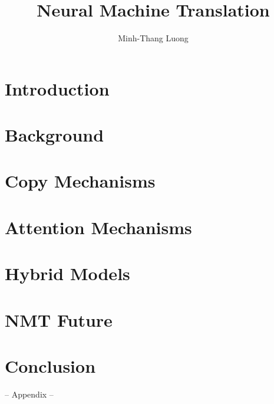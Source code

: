 \documentclass[12pt]{report}
\begin{document}
\title{Neural Machine Translation}
\author{Minh-Thang Luong}

\beforepreface
%
%
\afterpreface


\chapter{Introduction}
\label{c:intro}


\chapter{Background}
\label{c:background}


\chapter{Copy Mechanisms}
\label{c:copy}


\chapter{Attention Mechanisms}
\label{c:attention}


\chapter{Hybrid Models}
\label{c:hybrid}


\chapter{NMT Future}
\label{c:future}


\chapter{Conclusion}
\label{c:conclude}



 -- Appendix --
\appendix





\end{document}
